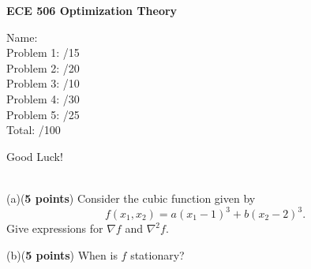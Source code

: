 \documentclass[12pt,legalpaper]{article}
\begin{document}
\vspace{2in}
\begin{center}
  {\Huge\bf ECE 506 Optimization Theory}
\end{center}
\vspace{0.5in}
%  
{\bf\large
\begin{flushleft}
 \hspace{0.3in} Name: \qquad \underline{\hspace{3in}}\\[0.5in]
 \hspace{1.5in}Problem 1: \underline{\hspace{0.3in}} /15 \\[0.1in]
 \hspace{1.5in}Problem 2: \underline{\hspace{0.3in}} /20 \\[0.1in]
 \hspace{1.5in}Problem 3: \underline{\hspace{0.3in}} /10 \\[0.1in]
 \hspace{1.5in}Problem 4: \underline{\hspace{0.3in}} /30 \\[0.1in]
 \hspace{1.5in}Problem 5: \underline{\hspace{0.3in}} /25 \\[0.5in]
 \hspace{1.5in}Total: \phantom{\hspace{0.4 true in}}
                     \underline{\hspace{0.3in}} /100
\end{flushleft}}
\vspace{2in}
{\bf\Huge
\begin{center}
  Good Luck!
\end{center}}
\newpage
%
%
\\
(a)({\bf 5 points}) Consider the cubic function given by
        $$f(x_1, x_2) = a (x_1-1)^3 + b (x_2-2)^3. $$
Give expressions for $\nabla f$ and $\nabla^2 f$.\\
\vspace{3.5 true in}

(b)({\bf 5 points}) When is $f$ stationary?\\
\vspace{1.0 true in}
\end{document}
